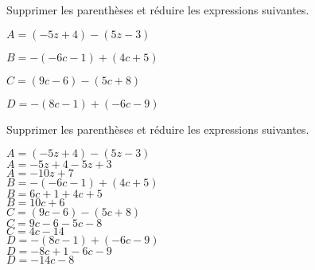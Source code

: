 \begin{exercice*}
    Supprimer les parenthèses et réduire les expressions suivantes.
    \begin{itemize}
        \begin{spacing}{1.2}
            \item[] $A= (-5z+4) - (5z-3)$
            \item[] $B= -(-6c-1) + (4c+5)$
            \item[] $C= (9c-6) - (5c+8)$
            \item[] $D= -(8c-1) + (-6c-9)$
        \end{spacing}
    \end{itemize}
\end{exercice*}
\begin{corrige}
    Supprimer les parenthèses et réduire les expressions suivantes.
    
    \begin{itemize}
        \def\item{}
        \item $A= (-5z+4) - (5z-3)$\\
        {\red 
        $A= -5z+4  -5z+3$\\
    $A=-10z+7$\\\smallskip
        }
        \item $B= -(-6c-1) + (4c+5)$\\
        {\red 
        $B= 6c+1 + 4c+5$\\
        $B=10c+6$\\\smallskip
        }
        \item $C= (9c-6) - (5c+8)$\\
        {\red 
        $C= 9c-6  -5c-8$\\
        $C=4c-14$\\\smallskip
        }
        \item $D= -(8c-1) + (-6c-9)$\\
        {\red 
        $D= -8c+1  -6c-9$\\
        $D=-14c-8$
        }
    \end{itemize}
\end{corrige}

